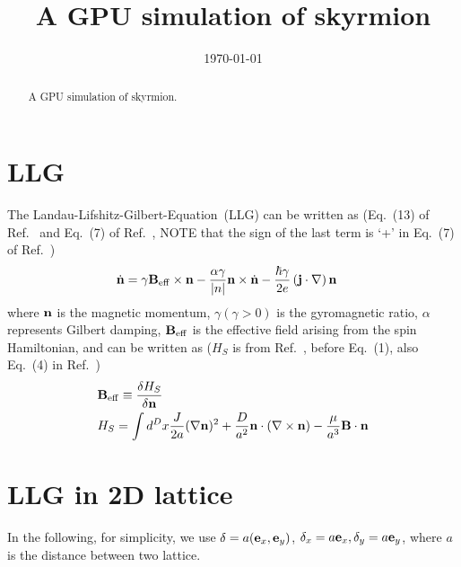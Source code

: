 \documentclass[aps,superscriptaddress,groupedaddress]{revtex4}  %
\begin{document}
\widetext

\title{A GPU simulation of skyrmion}

\date{\today}


\begin{abstract}
A GPU simulation of skyrmion.
\end{abstract}

\maketitle

\section{\label{sec:1}LLG}

The Landau-Lifshitz-Gilbert-Equation~(LLG) can be written as (Eq.~(13) of Ref.~\cite{review1} and Eq.~(7) of Ref.~\cite{hamiton}, NOTE that the sign of the last term is `+' in Eq.~(7) of Ref.~\cite{hamiton})
\begin{equation}
\begin{split}
&\dot {\bf n}=\gamma {\bf B}_{\rm eff}\times {\bf n}-\frac{\alpha \gamma}{|n|} {\bf n}\times \dot{\bf n}-\frac{\hbar \gamma}{2e}\left({\bf j}\cdot {\bf \nabla}\right){\bf n}
\end{split}
\end{equation}
where ${\bf n}$ is the magnetic momentum, $\gamma(\gamma > 0)$ is the gyromagnetic ratio, $\alpha$ represents Gilbert damping, ${\bf B}_{\rm eff}$ is the effective field arising from the spin Hamiltonian, and can be written as ($H_S$ is from Ref.~\cite{hamiton}, before Eq.~(1), also Eq.~(4) in Ref.~\cite{pin2})
\begin{equation}
\begin{split}
&{\bf B}_{\rm eff}\equiv \frac{\delta H_S}{\delta {\bf n}}\\
&H_S=\int d^D x\frac{J}{2a} (\nabla  {\bf n})^2+\frac{D}{a^2}{\bf n}\cdot \left(\nabla \times {\bf n}\right)-\frac{\mu}{a^3}{\bf B}\cdot {\bf n}\\
\end{split}
\end{equation}

\section{\label{sec:2}LLG in 2D lattice}

In the following, for simplicity, we use $\delta = a({\bf e}_x, {\bf e}_y)$, $\delta _x=a{\bf e}_x, \delta _y=a{\bf e}_y$, where $a$ is the distance between two lattice.
\end{document}
